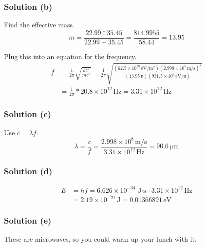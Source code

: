 \documentclass[12pt]{article}
\newcommand{\E}[1]{\times 10^{#1}}
\begin{document}
        \subsubsection{Solution (b)}
            Find the effective mass.
            \begin{equation}
                m   =   \frac{22.99 * 35.45}{22.99 + 35.45}
                    =   \frac{814.9955}{58.44}
                    =   13.95
            \end{equation}

            Plug this into an equation for the frequency.
            \begin{align}
                f   &=  \frac{1}{2\pi} \sqrt{\frac{kc^2}{mc^2}}
                    =   \frac{1}{2\pi} \sqrt{\frac{(62.5\E{18}\,\unit{\eV/\meter^2})(2.998\E{8}\,\unit{\meter/\second})^2}{(13.95\,\unit{\amu})(931.5\E{6}\,\unit{\eV/\amu})}}\\
                    &=  \frac{1}{2\pi} * 20.8\E{12}\,\unit{\hertz}
                    =   \boxed{3.31\E{12}\,\unit{\hertz}}
            \end{align}

        \subsubsection{Solution (c)}
            Use $c = \lambda f$.
            \begin{equation}
                \lambda = \frac{c}{f}
                    =   \frac{2.998\E{8}\,\unit{\meter/\second}}{3.31\E{12}\,\unit{\hertz}}
                    =   \boxed{90.6\,\unit{\micro\meter}}
            \end{equation}

        \subsubsection{Solution (d)}
            \begin{align}
                E   &=  hf
                    =   6.626\E{-34}\,\unit{\joule\cdot\second} \cdot 3.31\E{12}\,\unit{\hertz}\\
                    &=  \boxed{2.19\E{-21}\,\unit{\joule}}
                    =   0.01366891\,\unit{\eV}
            \end{align}

        \subsubsection{Solution (e)}
            These are microwaves, so you could warm up your lunch with it.
\end{document}
